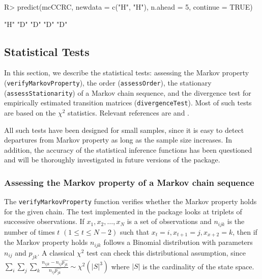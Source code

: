 \documentclass[
  nojss]{jss}
\begin{document}
\begin{CodeChunk}

\begin{CodeInput}
R> predict(mcCCRC, newdata = c("H", "H"), n.ahead = 5, continue = TRUE)
\end{CodeInput}

\begin{CodeOutput}
[1] "H" "D" "D" "D" "D"
\end{CodeOutput}
\end{CodeChunk}

\hypertarget{statistical-tests}{%
\subsection{Statistical Tests}\label{statistical-tests}}

In this section, we describe the statistical tests: assessing the Markov property (\texttt{verifyMarkovProperty}), the order (\texttt{assessOrder}), the stationary (\texttt{assessStationarity}) of a Markov chain sequence, and the divergence test for empirically estimated transition matrices (\texttt{divergenceTest}). Most of such tests are based on the \(\chi ^2\) statistics. Relevant references are \cite{kullback1962tests} and \cite{anderson1957statistical}.

All such tests have been designed for small samples, since it is easy to detect departures from Markov property as long as the sample size increases. In addition, the accuracy of the statistical inference functions has been questioned and will be thoroughly investigated in future versions of the package.

\hypertarget{assessing-the-markov-property-of-a-markov-chain-sequence}{%
\subsubsection{Assessing the Markov property of a Markov chain sequence}\label{assessing-the-markov-property-of-a-markov-chain-sequence}}

The \texttt{verifyMarkovProperty} function verifies whether the Markov property holds for the given chain. The test implemented in the package looks at triplets of successive observations. If \(x_1, x_2, \ldots, x_N\) is a set of observations and \(n_{ijk}\) is the number of times \(t\) \(\left(1 \le t \le N-2 \right)\) such that \(x_t=i, x_{t+1}=j, x_{x+2}=k\), then if the Markov property holds \(n_{ijk}\) follows a Binomial distribution with parameters \(n_{ij}\) and \(p_{jk}\). A classical \(\chi^2\) test can check this distributional assumption, since \(\sum_{i}\sum_{j}\sum_{k}\frac{n_{ijk}-n_{ij}\hat{p_{jk}}}{n_{ij}\hat{p_{jk}}}\sim \chi^2\left(|S|^3 \right )\) where \(|S|\) is the cardinality of the state space.
\end{document}
